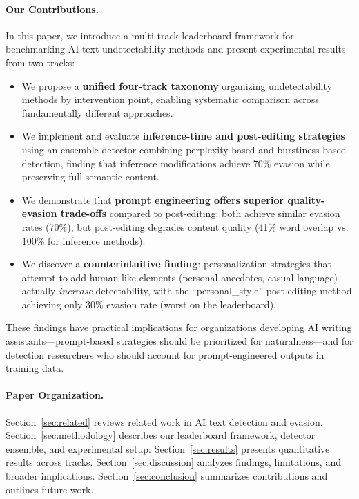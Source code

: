 \paragraph{Our Contributions.} In this paper, we introduce a multi-track leaderboard framework for benchmarking AI text undetectability methods and present experimental results from two tracks:

\begin{itemize}
    \item We propose a \textbf{unified four-track taxonomy} organizing undetectability methods by intervention point, enabling systematic comparison across fundamentally different approaches.

    \item We implement and evaluate \textbf{inference-time and post-editing strategies} using an ensemble detector combining perplexity-based and burstiness-based detection, finding that inference modifications achieve 70\% evasion while preserving full semantic content.

    \item We demonstrate that \textbf{prompt engineering offers superior quality-evasion trade-offs} compared to post-editing: both achieve similar evasion rates (70\%), but post-editing degrades content quality (41\% word overlap vs. 100\% for inference methods).

    \item We discover a \textbf{counterintuitive finding}: personalization strategies that attempt to add human-like elements (personal anecdotes, casual language) actually \textit{increase} detectability, with the ``personal\_style'' post-editing method achieving only 30\% evasion rate (worst on the leaderboard).
\end{itemize}

These findings have practical implications for organizations developing AI writing assistants---prompt-based strategies should be prioritized for naturalness---and for detection researchers who should account for prompt-engineered outputs in training data.

\paragraph{Paper Organization.} Section~\ref{sec:related} reviews related work in AI text detection and evasion. Section~\ref{sec:methodology} describes our leaderboard framework, detector ensemble, and experimental setup. Section~\ref{sec:results} presents quantitative results across tracks. Section~\ref{sec:discussion} analyzes findings, limitations, and broader implications. Section~\ref{sec:conclusion} summarizes contributions and outlines future work.
